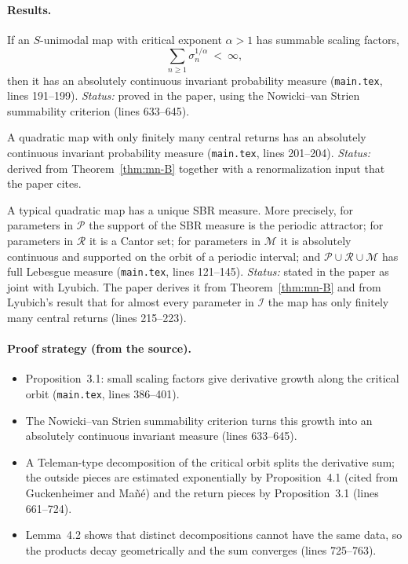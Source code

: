 \paragraph{Results.}

\begin{theorem}
\label{thm:mn-B}
If an $S$-unimodal map with critical exponent $\alpha>1$ has summable scaling factors,
\[
\sum_{n\ge1}\sigma_n^{1/\alpha}\ <\ \infty,
\]
then it has an absolutely continuous invariant probability measure (\texttt{main.tex}, lines 191--199).  \emph{Status:}
proved in the paper, using the Nowicki--van Strien summability criterion \cite{NowickiVanStrien} (lines 633--645).
\end{theorem}

\begin{corollary}
\label{cor:mn-finite}
A quadratic map with only finitely many central returns has an absolutely continuous invariant probability measure
(\texttt{main.tex}, lines 201--204).  \emph{Status:} derived from Theorem~\ref{thm:mn-B} together with a renormalization
input that the paper cites.
\end{corollary}

\begin{theorem}
\label{thm:mn-A}
A typical quadratic map has a unique SBR measure.  More precisely, for parameters in $\mathcal P$ the support of the SBR
measure is the periodic attractor; for parameters in $\mathcal R$ it is a Cantor set; for parameters in $\mathcal M$ it is
absolutely continuous and supported on the orbit of a periodic interval; and $\mathcal P\cup\mathcal R\cup\mathcal M$ has
full Lebesgue measure (\texttt{main.tex}, lines 121--145).  \emph{Status:} stated in the paper as joint with Lyubich.  The
paper derives it from Theorem~\ref{thm:mn-B} and from Lyubich's result that for almost every parameter in $\mathcal I$ the
map has only finitely many central returns (lines 215--223).
\end{theorem}

\paragraph{Proof strategy (from the source).}
\begin{itemize}
\item Proposition~3.1: small scaling factors give derivative growth along the critical orbit (\texttt{main.tex}, lines 386--401).
\item The Nowicki--van Strien summability criterion turns this growth into an absolutely continuous invariant measure
(lines 633--645).
\item A Teleman-type decomposition of the critical orbit splits the derivative sum; the outside pieces are estimated
exponentially by Proposition~4.1 (cited from Guckenheimer and Ma\~n\'e) and the return pieces by Proposition~3.1 (lines 661--724).
\item Lemma~4.2 shows that distinct decompositions cannot have the same data, so the products decay geometrically and the sum
converges (lines 725--763).
\end{itemize}

